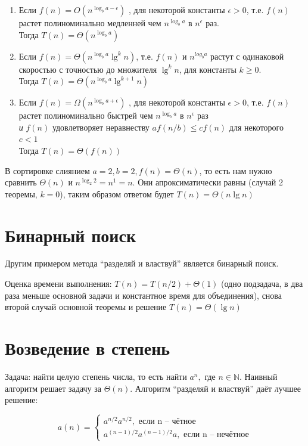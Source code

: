 \documentclass[a4paper,11pt]{article}
\begin{document}
\begin{enumerate}
\item Если $f(n) = O(n^{\log_{b}{a - \epsilon}})$ , для некоторой константы
  $\epsilon > 0$, т.е. $f(n)$ растет полиноминально медленней чем
  $n^{\log_b a}$ в $n^\epsilon$ раз.\\
  Тогда $T(n) = \Theta(n^{\log_b a})$

\item Если $f(n) = \Theta(n^{\log_b a}\lg^k n)$, т.е. $f(n)$ и $n^{log_b a}$
  растут с одинаковой скоростью с точностью до множителя $\lg^k n$, для
  константы $k \geqslant 0$.\\ Тогда $T(n) = \Theta(n^{\log_b a} \lg^{k+1} n)$

\item Если $f(n) = \Omega(n^{\log_b{a + \epsilon}})$ , для некоторой константы
  $\epsilon > 0$, т.е. $f(n)$ растет полиноминально быстрей чем $n^{\log_b a}$
  в $n^\epsilon$ раз \\ \emph{и} $f(n)$ удовлетворяет неравнеству $a f(n/b)
  \leqslant c f(n)$ для некоторого $c < 1$ \\ Тогда $T(n) = \Theta(f(n))$
\end{enumerate}

В сортировке слиянием $a = 2, b = 2, f(n) = \Theta(n)$, то есть нам нужно
сравнить $\Theta(n)$ и $n^{\log_2 2} = n^1 = n$. Они апроксиматически равны
(случай 2 теоремы, $k = 0$), таким образом ответом будет $T(n) = \Theta(n \lg
n)$

\section{Бинарный поиск}
Другим примером метода ``разделяй и властвуй'' является бинарный поиск.

Оценка времени выполнения: $T(n) = T(n/2) + \Theta(1)$ (одно подзадача, в два
раза меньше основной задачи и константное время для объединения), снова второй
случай основной теоремы и решение $T(n) = \Theta(\lg n)$

\section{Возведение в степень}
Задача: найти целую степень числа, то есть найти $a^n, \text{ где } n \in
\mathbb{N}$. Наивный алгоритм решает задачу за  $\Theta(n)$. Алгоритм ``разделяй
и властвуй'' даёт лучшее решение:

\begin{equation*}
  a(n) = \begin{cases}
    a^{n/2} a^{n/2}, \text{ если n -- чётное} \\
    a^{(n-1)/2} a^{(n-1)/2} a,  \text{ если n -- нечётное}
  \end{cases}
\end{equation*}
\end{document}
